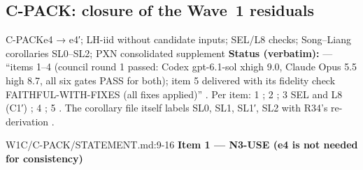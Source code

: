 \subsection{C-PACK: closure of the Wave~1 residuals}\label{sec:loop:pack}
\begin{card}{C-PACK}{e4 → e4′; LH-iid without candidate inputs; SEL/L8 checks; Song–Liang corollaries SL0–SL2; PXN consolidated supplement}
\textbf{Status (verbatim):}  — ``items 1–4 (council round 1 passed: Codex gpt-6.1-sol xhigh 9.0, Claude Opus 5.5 high 8.7, all six gates PASS for both); item 5 delivered with its fidelity check FAITHFUL-WITH-FIXES (all fixes applied)'' . Per item: 1 ; 2 ; 3 SEL and L8 (C1′) ; 4 ; 5  . The corollary file itself labels SL0, SL1, SL1′, SL2  with R34's re-derivation .
\begin{stmt}{W1C/C-PACK/STATEMENT.md:9-16}
\textbf{Item 1 — N3-USE (e4 is not needed for consistency)}


\end{stmt}
\end{card}
